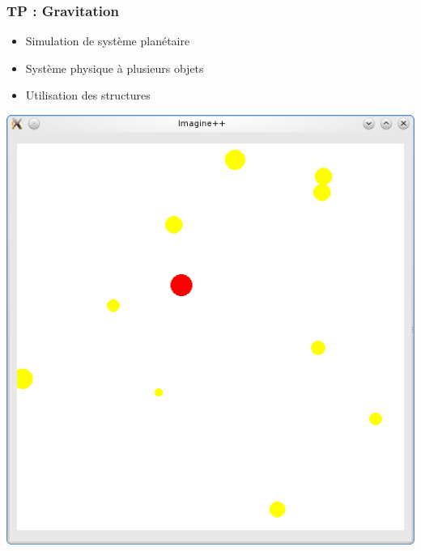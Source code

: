 \begin{frame}
	\frametitle{TP : Gravitation}
		\begin{minipage}{0.47\linewidth}
\begin{itemize}
	\item Simulation de système planétaire
	\item Système physique à plusieurs objets
	\item Utilisation des structures
\end{itemize}
\end{minipage}
\hfill
\begin{minipage}{0.47\linewidth}
  \centering
  \includegraphics[width=0.9\linewidth]{images/gravit.png}
\end{minipage}
\end{frame}

